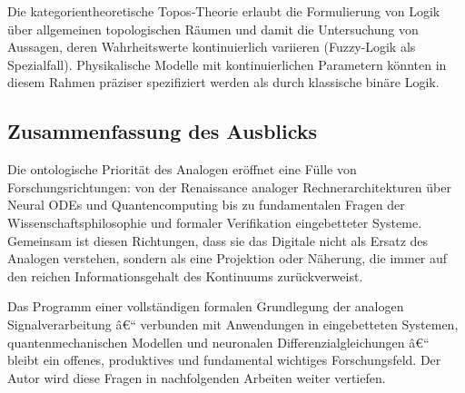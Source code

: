 ﻿\documentclass[a4paper,12pt]{article}
\theoremstyle{definition}
\begin{document}
Die kategorientheoretische Topos-Theorie \citep{Lawvere1968} erlaubt die
Formulierung von Logik über allgemeinen topologischen Räumen und damit die
Untersuchung von Aussagen, deren Wahrheitswerte kontinuierlich variieren
(Fuzzy-Logik als Spezialfall).  Physikalische Modelle mit kontinuierlichen
Parametern könnten in diesem Rahmen präziser spezifiziert werden als
durch klassische binäre Logik.

\subsection{Zusammenfassung des Ausblicks}

Die ontologische Priorität des Analogen eröffnet eine Fülle von Forschungsrichtungen:
von der Renaissance analoger Rechnerarchitekturen über Neural ODEs und
Quantencomputing bis zu fundamentalen Fragen der Wissenschaftsphilosophie
und formaler Verifikation eingebetteter Systeme.  Gemeinsam ist diesen Richtungen,
dass sie das Digitale nicht als Ersatz des Analogen verstehen, sondern als
eine Projektion oder Näherung, die immer auf den reichen Informationsgehalt
des Kontinuums zurückverweist.

Das Programm einer vollständigen formalen Grundlegung der analogen
Signalverarbeitung â€“ verbunden mit Anwendungen in eingebetteten Systemen,
quantenmechanischen Modellen und neuronalen Differenzialgleichungen â€“
bleibt ein offenes, produktives und fundamental wichtiges Forschungsfeld.
Der Autor wird diese Fragen in nachfolgenden Arbeiten \citep{Epp2026analog}
weiter vertiefen.



\end{document}
